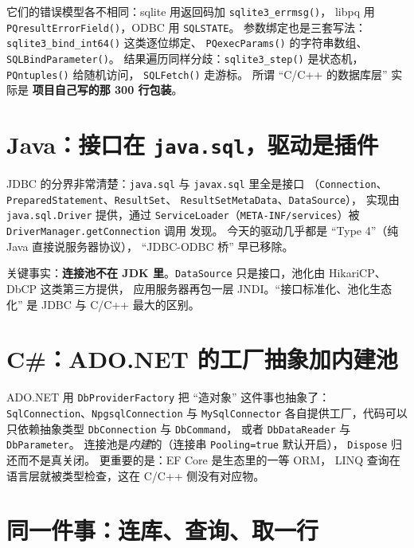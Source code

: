 \documentclass[12pt,a4paper,fontset=fandol]{ctexbook}
\newcommand{\Fn}[1]{\texttt{#1()}}
\newcommand{\Tp}[1]{\texttt{#1}}
\newcommand{\CSharp}{C\#}
\newcommand{\CppJava}{C/C++}
\begin{document}
它们的错误模型各不相同：sqlite 用返回码加 \Fn{sqlite3\_\allowbreak{}errmsg}，
libpq 用 \Fn{PQresult\allowbreak{}Error\allowbreak{}Field}，ODBC 用 \Tp{SQLSTATE}。
参数绑定也是三套写法：\Fn{sqlite3\_\allowbreak{}bind\_\allowbreak{}int64} 这类逐位绑定、
\Fn{PQexec\allowbreak{}Params} 的字符串数组、\Fn{SQLBind\allowbreak{}Parameter}。
结果遍历同样分歧：\Fn{sqlite3\_\allowbreak{}step} 是状态机，\Fn{PQntuples} 给随机访问，
\Fn{SQLFetch} 走游标。
所谓 ``\CppJava{} 的数据库层'' 实际是
\textbf{项目自己写的那 300 行包装}。

\section{Java：接口在 \Tp{java.sql}，驱动是插件}

JDBC 的分界非常清楚：\Tp{java.sql} 与 \Tp{javax.sql} 里全是接口
（\Tp{Connection}、\Tp{Prepared\allowbreak{}Statement}、\Tp{ResultSet}、
\Tp{Result\allowbreak{}Set\allowbreak{}Meta\allowbreak{}Data}、\Tp{DataSource}），
实现由 \Tp{java.sql.Driver} 提供，通过
\Tp{Service\allowbreak{}Loader}（\Tp{META-\allowbreak{}INF/\allowbreak{}\allowbreak{}services}）被
\Tp{Driver\allowbreak{}Manager.\allowbreak get\allowbreak{}Connection} 调用 发现。
今天的驱动几乎都是 ``Type 4''（纯 Java 直接说服务器协议），
``JDBC-ODBC 桥'' 早已移除。

关键事实：\textbf{连接池不在 JDK 里}。\Tp{DataSource}
只是接口，池化由 HikariCP、DbCP 这类第三方提供，
应用服务器再包一层 JNDI。``接口标准化、池化生态化''
是 JDBC 与 \CppJava{} 最大的区别。

\section{\CSharp{}：ADO.NET 的工厂抽象加内建池}

ADO.NET 用 \Tp{Db\allowbreak{}Provider\allowbreak{}Factory} 把 ``造对象'' 这件事也抽象了：
\Tp{Sql\allowbreak{}Connection}、\Tp{Npgsql\allowbreak{}Connection} 与 \Tp{My\allowbreak{}Sql\allowbreak{}Connector}
各自提供工厂，代码可以只依赖抽象类型 \Tp{Db\allowbreak{}Connection} 与 \Tp{DbCommand}，
或者 \Tp{Db\allowbreak{}Data\allowbreak{}Reader} 与 \Tp{DbParameter}。
连接池是\emph{内建}的（连接串 \Tp{Pooling=true} 默认开启），
\Tp{Dispose} 归还而不是真关闭。
更重要的是：EF Core 是生态里的一等 ORM，
LINQ 查询在语言层就被类型检查，这在 \CppJava{} 侧没有对应物。

\section{同一件事：连库、查询、取一行}
\end{document}
